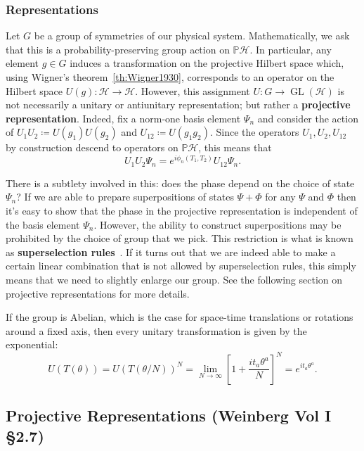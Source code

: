 \documentclass[10pt]{article}
\newcommand{\PH}{\mbb P\ms H}
\newcommand{\ms}{\mathscr}
\newcommand{\mbb}{\mathbb}
\newcommand{\FR}[2]{\frac{#1}{#2}}
\theoremstyle{plain}
\theoremstyle{definition}
\theoremstyle{remark}
\DeclareMathOperator{\GL}{GL}
\begin{document}
\subsubsection{Representations}
Let \(G\) be a group of symmetries of our physical system. Mathematically,
we ask that this is a probability-preserving group action on $\PH$.
In particular, any element \(g\in G\) induces a transformation on the
projective Hilbert space which, using Wigner's theorem~\ref{th:Wigner1930},
corresponds to an operator on the Hilbert space \(U(g)\colon \ms H \to \ms
H.\) However, this assignment \(U\colon G \to \GL(\ms H)\) is not necessarily
a unitary or antiunitary representation; but rather a \textbf{projective
representation}. Indeed, fix a norm-one basis element \(\Psi_n\) and
consider the action of \(U_1U_2 \coloneqq U(g_1)U(g_2)\) and
\(U_{12}\coloneqq U(g_1g_2)\). Since the operators \(U_1,U_2,U_{12}\)
by construction descend to operators on $\PH$, this means that
\[U_1U_2\Psi_n = e^{i\phi_n(T_1,T_2)}U_{12}\Psi_n.\]

There is a subtlety involved in this: does the phase depend on the
choice of state $\Psi_n$? If we are able to prepare
superpositions of states \(\Psi + \Phi\) for any \(\Psi\) and \(\Phi\) then
it's easy to show that the phase in the projective representation is
independent of the basis element \(\Psi_n\). However, the ability to
construct superpositions may be prohibited by the choice of group that
we pick. This restriction is what is known as \textbf{superselection
rules}~\cite{WWW52}. If it turns out that we are indeed able to make a
certain linear combination that is not allowed by superselection
rules, this simply means that we need to slightly enlarge our group.
See the following section on projective representations for more
details.

If the group is Abelian, which is the case for space-time translations or
rotations around a fixed axis, then every unitary transformation is given
by the exponential: \[U(T(\theta)) = U(T(\theta/N))^N = \lim_{N\to\infty}
\left[ 1+\FR{it_a\theta^a}{N} \right]^N = e^{it_a\theta^a}.\]
 

\subsection{Projective Representations (Weinberg Vol I \S 2.7)}
\end{document}
